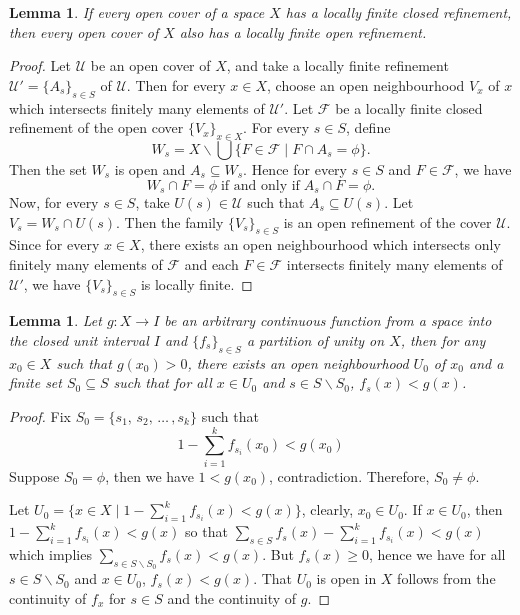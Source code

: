 \documentclass[12pt,oneside,english]{amsbook}
\numberwithin{equation}{section} %
\numberwithin{figure}{section} %
\theoremstyle{plain}
\numberwithin{section}{chapter}
\theoremstyle{plain}
\newtheorem{lem}[thm]{Lemma}
\begin{document}
\begin{lem} \label{lem:paracompact:4}
  If every open cover of a space $X$ has a locally finite closed refinement, then every open cover of $X$ also has a locally finite open refinement.
\end{lem}
\begin{proof}
  Let $\mathcal{U}$ be an open cover of $X$, and take a locally finite refinement $\mathcal{U}' = \{A_s\}_{s \in S}$ of $\mathcal{U}$. Then for every $x \in X$, choose an open neighbourhood $V_x$ of $x$ which intersects finitely many elements of $\mathcal{U'}$. Let $\mathcal{F}$ be a locally finite closed refinement of the open cover $\{V_x\}_{x \in X}$. For every $s \in S$, define $$ W_s = X \backslash \bigcup\{F \in \mathcal{F} \; | \; F \cap A_s = \phi\}.$$ Then the set $W_s$ is open and $A_s \subseteq W_s$. Hence for every $s \in S$ and $F \in \mathcal{F}$, we have $$W_s \cap F = \phi \; \text{if and only if} \; A_s \cap F = \phi . $$ Now, for every $s \in S$, take $U(s) \in \mathcal{U}$ such that $A_s \subseteq U(s)$. Let $V_s = W_s \cap U(s)$. Then the family $\{V_s\}_{s \in S}$ is an open refinement of the cover $\mathcal{U}$. Since for every $x \in X$, there exists an open neighbourhood which intersects only finitely many elements of $\mathcal{F}$ and each $F \in \mathcal{F}$ intersects finitely many elements of $\mathcal{U'}$, we have $\{V_s\}_{s \in S}$ is locally finite.
\end{proof}

\begin{lem} \label{lem:paracompact:5}
  Let $g: X \to I$ be an arbitrary continuous function from a space into the closed unit interval $I$ and $\{f_s\}_{s \in S}$ a partition of unity on $X$, then for any $x_{0} \in X$ such that $g(x_{0}) > 0$, there exists an open neighbourhood $U_{0}$ of $x_{0}$ and a finite set $S_{0} \subseteq S$ such that for all $x \in U_{0}$  and $s \in S \backslash S_{0}$, $f_{s}(x) < g(x)$.
\end{lem}
\begin{proof}
  Fix $S_{0} = \{s_{1}, \, s_{2}, \, \ldots \, , s_{k}\}$ such that $$1 - \sum_{i=1}^{k}f_{s_{i}}(x_{0}) < g(x_{0})$$
  Suppose $S_{0} = \phi$, then we have $1 < g(x_{0})$, contradiction. Therefore, $S_{0} \neq \phi$.

  Let $U_{0} = \{x \in X \; | \; 1 - \sum_{i = 1}^{k}f_{s_{i}}(x) < g(x) \}$, clearly, $x_{0} \in U_{0}$. If $x \in U_{0}$, then $1 - \sum_{i = 1}^{k}f_{s_{i}}(x) < g(x)$ so that $\sum_{s \in S}f_{s}(x) - \sum_{i = 1}^{k}f_{s_{i}}(x) < g(x)$ which implies $\sum_{s \in S \backslash S_{0}}f_{s}(x) < g(x)$. But $f_{s}(x) \geq 0$, hence we have for all $s \in S \backslash S_{0}$ and $x \in U_{0}$, $f_{s}(x) < g(x)$. That $U_{0}$ is open in $X$ follows from the continuity of $f_x$ for $s \in S$ and the continuity of $g$. 
\end{proof}
\end{document}
